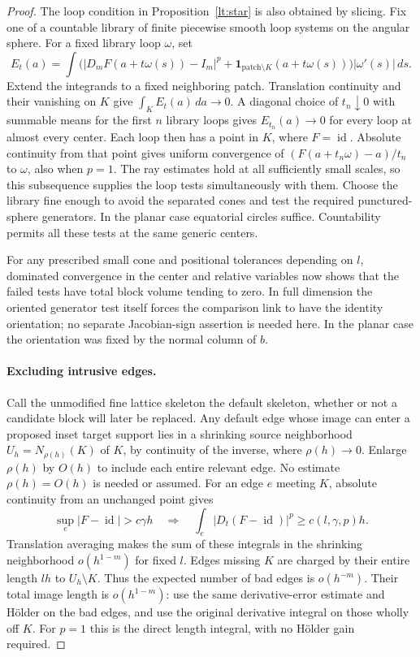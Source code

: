 \documentclass[11pt]{article}
\numberwithin{equation}{section}
\theoremstyle{definition}
\theoremstyle{remark}
\newcommand{\Id}{\operatorname{id}}
\begin{document}
\begin{proof}
The loop condition in Proposition~\ref{lt:star} is also obtained by slicing.
Fix one of a countable library of finite piecewise smooth loop
systems on the angular sphere.  For a fixed library loop $\omega$, set
\[
 E_t(a)=\int\bigl(|D_mF(a+t\omega(s))-I_m|^p
       +\mathbf1_{\text{patch}\setminus K}(a+t\omega(s))\bigr)
                         |\omega'(s)|\,ds.
\]
Extend the integrands to a fixed neighboring patch.  Translation
continuity and their vanishing on $K$ give
$\int_K E_t(a)\,da\to0$.  A diagonal choice of $t_n\downarrow0$
with summable means for the first $n$ library loops gives
$E_{t_n}(a)\to0$ for every loop at almost every center.  Each loop
then has a point in $K$, where $F=\Id$.  Absolute continuity from
that point gives uniform convergence of
$(F(a+t_n\omega)-a)/t_n$ to $\omega$, also when $p=1$.
The ray estimates hold at all sufficiently small scales, so this
subsequence supplies the loop tests simultaneously with them.
Choose the library fine enough to avoid the separated cones and test
the required punctured-sphere generators.  In the planar case
equatorial circles suffice.  Countability permits all these tests at
the same generic centers.

For any prescribed small cone and positional tolerances depending on
$l$, dominated convergence in the center and relative variables now
shows that the failed tests have total block volume tending to zero.
In full dimension the oriented generator test itself forces the
comparison link to have the identity orientation; no separate
Jacobian-sign assertion is needed here.  In the planar case the
orientation was fixed by the normal column of $b$.

\paragraph{Excluding intrusive edges.}
Call the unmodified fine lattice skeleton the default skeleton,
whether or not a candidate block will later be replaced.  Any default
edge whose image can enter a proposed inset target support lies in a
shrinking source neighborhood $U_h=N_{\rho(h)}(K)$ of $K$, by
continuity of the inverse, where $\rho(h)\to0$.  Enlarge $\rho(h)$
by $O(h)$ to include each entire relevant edge.  No estimate
$\rho(h)=O(h)$ is needed or assumed.
For an edge $e$ meeting $K$, absolute continuity from an unchanged
point gives
\[
 \sup_e|F-\Id|>c\gamma h
 \quad\Longrightarrow\quad
 \int_e|D_t(F-\Id)|^p\ge c(l,\gamma,p)h.
\]
Translation averaging makes the sum of these integrals in the
shrinking neighborhood $o(h^{1-m})$ for fixed $l$.  Edges missing $K$
are charged by their entire length $lh$ to
$U_h\setminus K$.  Thus the expected number of bad edges is
$o(h^{-m})$.  Their total image length is $o(h^{1-m})$: use the same
derivative-error estimate and H\"older on the bad edges, and use the
original derivative integral on those wholly off $K$.  For $p=1$
this is the direct length integral, with no H\"older gain required.


\end{proof}
\end{document}
